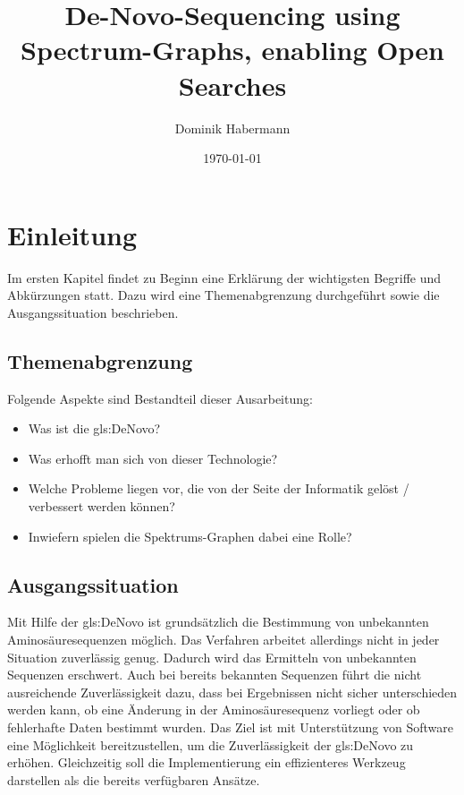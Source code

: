 \documentclass[a4paper, 12pt]{article}
\title{De-Novo-Sequencing using Spectrum-Graphs, enabling Open Searches}
\author{Dominik Habermann}
\date{\today}
\begin{document}
\maketitle

\section{Einleitung}
Im ersten Kapitel findet zu Beginn eine Erklärung der wichtigsten Begriffe und Abkürzungen statt. Dazu wird eine Themenabgrenzung durchgeführt sowie die Ausgangssituation beschrieben.

\printnoidxglossaries

\subsection{Themenabgrenzung}
Folgende Aspekte sind Bestandteil dieser Ausarbeitung:
\begin{itemize}
   \item Was ist die \gls{gls:DeNovo}?
   \item Was erhofft man sich von dieser Technologie?
   \item Welche Probleme liegen vor, die von der Seite der Informatik gelöst / verbessert werden können?
   \item Inwiefern spielen die Spektrums-Graphen dabei eine Rolle?
\end{itemize}

\subsection{Ausgangssituation}
Mit Hilfe der \gls{gls:DeNovo} ist grundsätzlich die Bestimmung von unbekannten Aminosäuresequenzen möglich. Das Verfahren arbeitet allerdings nicht in jeder Situation zuverlässig genug. Dadurch wird das Ermitteln von unbekannten Sequenzen erschwert. Auch bei bereits bekannten Sequenzen führt die nicht ausreichende Zuverlässigkeit dazu, dass bei Ergebnissen nicht sicher unterschieden werden kann, ob eine Änderung in der Aminosäuresequenz vorliegt oder ob fehlerhafte Daten bestimmt wurden.
Das Ziel ist mit Unterstützung von Software eine Möglichkeit bereitzustellen, um die Zuverlässigkeit der \gls{gls:DeNovo} zu erhöhen. Gleichzeitig soll die Implementierung ein effizienteres Werkzeug darstellen als die bereits verfügbaren Ansätze.
\end{document}
